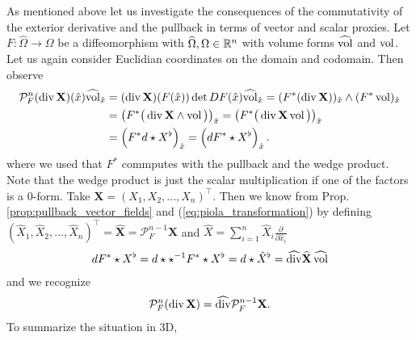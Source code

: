 \documentclass[../master_thesis.tex]{subfiles}
\begin{document}
As mentioned above let us investigate the consequences of the 
commutativity of the exterior derivative and the pullback in terms 
of vector and scalar proxies.
Let $F: \widehat{\Omega} \rightarrow \Omega$ be a diffeomorphism with 
$\widehat{\Omega}, \Omega \in \mathbb{R}^n$ with volume forms $\widehat{\operatorname{vol}}$ and 
$\operatorname{vol}$. Let us again consider Euclidian 
coordinates on the domain and codomain. Then observe
\begin{align*}
    \mathcal{P}^n_F (\operatorname{div} \mathbf{X})(\hat{x}) \widehat{\operatorname{vol}}_{\hat{x}}
    &= (\operatorname{div} \mathbf{X})(F(\hat{x}))  \det DF(\hat{x}) \widehat{\operatorname{vol}}_{\hat{x}} 
    = ( F^* (\operatorname{div} \mathbf{X}))_{\hat{x}} \wedge (F^* \operatorname{vol})_{\hat{x}}
    \\ &= \left( F^* \big( \operatorname{div} \mathbf{X} \wedge \operatorname{vol} \big) \right)_{\hat{x}}
    =  \left( F^* \big( \operatorname{div} \mathbf{X} \operatorname{vol} \big) \right)_{\hat{x}}
    \\ &= \left( F^* d \star X^\flat  \right)_{\hat{x}}
    = \left( d F^* \star X^\flat  \right)_{\hat{x}}.
\end{align*}
where we used that $F^*$ commputes with the pullback and the 
wedge product. Note that the wedge product is just the scalar multiplication 
if one of the factors is a $0$-form. Take $\mathbf{X} = (X_1, X_2, ..., X_n)^\top$. 
Then we know from Prop.\,\ref{prop:pullback_vector_fields} and (\ref{eq:piola_transformation})
by defining $(\hat{X}_1, \hat{X}_2, ..., \hat{X}_n)^\top = \mathbf{\hat{X}} = \mathcal{P}^{n-1}_F \mathbf{X}$
and $\hat{X} = \sum_{i=1}^n \hat{X}_i \frac{\partial}{\partial \hat{x}_i}$
\begin{align*}
    d F^* \star X^\flat = d \star \star^{-1} F^* \star X^\flat 
    = d \star \hat{X}^\flat = \widehat{\operatorname{div}} \mathbf{\widehat{X}} \, \widehat{\operatorname{vol}}
\end{align*}
and we recognize 
\begin{align*}
    \mathcal{P}^{n}_F (\operatorname{div} \mathbf{X}) = \widehat{\operatorname{div}} \mathcal{P}^{n-1}_F \mathbf{X}.
\end{align*}
To summarize the situation in 3D,
\end{document}
